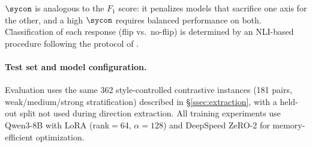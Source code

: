 $\sycon$ is analogous to the $F_1$ score: it penalizes models that sacrifice one axis for the other, and a high $\sycon$ requires balanced performance on both.
Classification of each response (flip vs.\ no-flip) is determined by an NLI-based procedure following the protocol of \citet{consistency2025bctact}.

\paragraph{Test set and model configuration.}
Evaluation uses the same 362 style-controlled contrastive instances (181 pairs, weak/medium/strong stratification) described in \S\ref{ssec:extraction}, with a held-out split not used during direction extraction.
All training experiments use Qwen3-8B with LoRA (rank$=$64, $\alpha{=}128$) and DeepSpeed ZeRO-2 for memory-efficient optimization.
